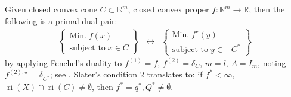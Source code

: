 \begin{coro}\label{coro:044-conic}
	Given closed convex cone $C\subset \mathbb{R}^m$, closed convex proper $f:\mathbb{R}^m\to \overline{\mathbb{R}}$, then the following is a primal-dual pair:
	\[
		\begin{matrix}
			\begin{Bmatrix}
				\text{Min.}\;    f(x) \\
				\text{subject to}\;  x\in C
			\end{Bmatrix} & \leftrightarrow &
			\begin{Bmatrix}
				\text{Min.}\;    f^\star(y) \\
				\text{subject to}\;    y\in -C^\ast
			\end{Bmatrix}
		\end{matrix}
	\]
	by applying Fenchel's duality to $f^{(1)}=f$, $f^{(2)}=\delta_C$, $m=l$, $A=I_m$, noting $f^{(2),\star}=\delta_{C^\ast}$; see .
	Slater's condition 2 translates to: if $f^\ast<\infty$, $\operatorname{ri}(X)\cap \operatorname{ri}(C)\neq\emptyset$, then $f^\ast=q^\ast,Q^\ast\neq\emptyset$.
\end{coro}
